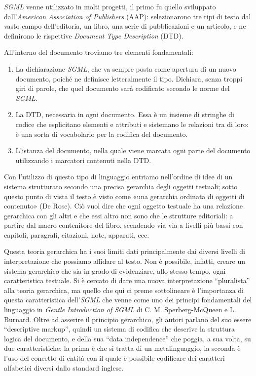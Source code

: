\documentclass[
  b5paper,
  twoside,
  12pt,
  chapterprefix=false,
  bibliography=totocnumbered,
  parskip=false]{scrbook}
\begin{document}
\emph{SGML} venne utilizzato in molti progetti, il primo fu quello sviluppato
dall'\emph{American Association of Publishers} (AAP): selezionarono tre tipi
di testo dal vasto campo dell'editoria, un libro, una serie di
pubblicazioni e un articolo, e ne definirono le rispettive \emph{Document
Type Description} (DTD).

All'interno del documento troviamo tre elementi fondamentali:

\begin{enumerate}
\def\labelenumi{\arabic{enumi}.}
\item
  La dichiarazione \emph{SGML}, che va sempre posta come apertura di un
  nuovo documento, poiché ne definisce letteralmente il tipo.
  Dichiara, senza troppi giri di parole, che quel documento sarà
  codificato secondo le norme del \emph{SGML}.
\item
  La DTD, necessaria in ogni documento. Essa è un insieme di stringhe
  di codice che esplicitano elementi e attributi e sistemano le
  relazioni tra di loro: è una sorta di vocabolario per la codifica
  del documento.
\item
  L'istanza del documento, nella quale viene marcata ogni parte del
  documento utilizzando i marcatori contenuti nella DTD.
\end{enumerate}

Con l'utilizzo di questo tipo di linguaggio entriamo nell'ordine di idee
di un sistema strutturato secondo una precisa gerarchia degli oggetti
testuali; sotto questo punto di vista il testo è visto come «una
gerarchia ordinata di oggetti di contenuto» (De Rose). Ciò vuol dire che
ogni oggetto testuale ha una relazione gerarchica con gli altri e che
essi altro non sono che le strutture editoriali: a partire dal macro
contenitore del libro, scendendo via via a livelli più bassi con
capitoli, paragrafi, citazioni, note, apparati, ecc.

Questa teoria gerarchica ha i suoi limiti dati principalmente dai
diversi livelli di interpretazione che possiamo affidare al testo. Non è
possibile, infatti, creare un sistema gerarchico che sia in grado di
evidenziare, allo stesso tempo, ogni caratteristica testuale. Si è
cercato di dare una nuova interpretazione \enquote{pluralista} alla teoria
gerarchica, ma quello che qui ci preme sottolineare è l'importanza di
questa caratteristica dell'\emph{SGML} che venne come uno dei principi
fondamentali del linguaggio in \emph{Gentle Introduction of SGML} di C. M.
Sperberg-McQueen e L. Burnard. Oltre ad asserire il principio
gerarchico, gli autori parlano del suo essere \enquote{descriptive markup},
quindi un sistema di codifica che descrive la struttura logica del
documento, e della sua \enquote{data independence} che poggia, a sua volta, su
due caratteristiche: la prima è che si tratta di un metalinguaggio, la
seconda è l'uso del concetto di entità con il quale è possibile
codificare dei caratteri alfabetici diversi dallo standard inglese.
\end{document}
